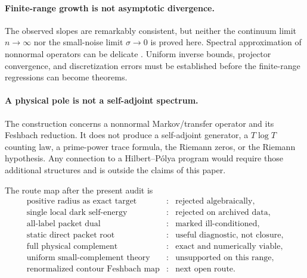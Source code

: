 \documentclass[11pt]{article}
\theoremstyle{definition}
\theoremstyle{remark}
\begin{document}
\paragraph{Finite-range growth is not asymptotic divergence.}
The observed slopes are remarkably consistent, but neither the continuum
limit $n\to\infty$ nor the small-noise limit $\sigma\to0$ is proved here.
Spectral approximation of nonnormal operators can be delicate
\citep{Chatelin1983,TrefethenEmbree2005}.  Uniform inverse bounds, projector
convergence, and discretization errors must be established before the
finite-range regressions can become theorems.

\paragraph{A physical pole is not a self-adjoint spectrum.}
The construction concerns a nonnormal Markov/transfer operator and its
Feshbach reduction.  It does not produce a self-adjoint generator, a
$T\log T$ counting law, a prime-power trace formula, the Riemann zeros, or
the Riemann hypothesis.  Any connection to a Hilbert--P\'olya program would
require those additional structures and is outside the claims of this
paper.

The route map after the present audit is
\begin{equation}
\label{eq:route-map}
 \boxed{
 \begin{array}{rcl}
 \text{positive radius as exact target} &:& \text{rejected algebraically},\\
 \text{single local dark self-energy} &:& \text{rejected on archived data},\\
 \text{all-label packet dual} &:& \text{marked ill-conditioned},\\
 \text{static direct packet root} &:& \text{useful diagnostic, not closure},\\
 \text{full physical complement} &:& \text{exact and numerically viable},\\
 \text{uniform small-complement theory} &:& \text{unsupported on this range},\\
 \text{renormalized contour Feshbach map} &:& \text{next open route}.
 \end{array}}
\end{equation}
\end{document}
